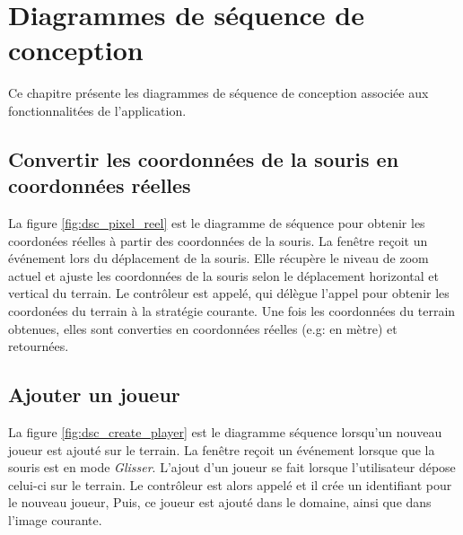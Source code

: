 
\chapter{Diagrammes de séquence de conception}
\label{s:sequence_conception}

Ce chapitre présente les diagrammes de séquence de conception associée aux fonctionnalitées de l'application.

\section{Convertir les coordonnées de la souris en coordonnées réelles}
\label{sec:convertir_coordonnees_souris}


La figure \ref{fig:dsc_pixel_reel} est le diagramme de séquence pour obtenir les coordonées réelles à partir des coordonnées de la souris.
La fenêtre reçoit un événement lors du déplacement de la souris.
Elle récupère le niveau de zoom actuel et ajuste les coordonnées de la souris selon le déplacement horizontal et vertical du terrain.
Le contrôleur est appelé, qui délègue l'appel pour obtenir les coordonées du terrain à la stratégie courante.
Une fois les coordonnées du terrain obtenues, elles sont converties en coordonnées réelles (e.g: en mètre) et retournées.


\section{Ajouter un joueur}
\label{sec:ajouter_joueur}


La figure \ref{fig:dsc_create_player} est le diagramme séquence lorsqu'un nouveau joueur est ajouté sur le terrain.
La fenêtre reçoit un événement lorsque que la souris est en mode \textit{Glisser}.
L'ajout d'un joueur se fait lorsque l'utilisateur dépose celui-ci sur le terrain.
Le contrôleur est alors appelé et il crée un identifiant pour le nouveau joueur,
Puis, ce joueur est ajouté dans le domaine, ainsi que dans l'image courante.


